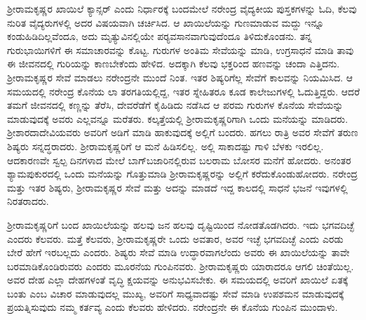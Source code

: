 ಶ‍್ರೀರಾಮಕೃಷ್ಣರ ಖಾಯಿಲೆ ಕ್ಯಾನ್ಸರ್ ಎಂದು ನಿರ್ಧಾರಕ್ಕೆ ಬಂದಮೇಲೆ ನರೇಂದ್ರ ವೈದ್ಯಕೀಯ ಪುಸ್ತಕಗಳನ್ನು ಓದಿ, ಕೆಲವು ನುರಿತ ವೈದ್ಯರುಗಳಲ್ಲಿ ಅದರ ವಿಷಯವಾಗಿ ಚರ್ಚಿಸಿದ. ಆ ಖಾಯಿಲೆಯನ್ನು ಗುಣಮಾಡುವ ಮದ್ದು ಇನ್ನೂ ಕಂಡುಹಿಡಿದಿಲ್ಲವೆಂದೂ, ಅದು ಮೃತ್ಯುವಿನಲ್ಲಿಯೇ ಪರ‍್ಯವಸಾನವಾಗುವುದೆಂದೂ ತಿಳಿದುಕೊಂಡನು. ತನ್ನ ಗುರುಭಾಯಿಗಳಿಗೆ ಈ ಸಮಾಚಾರವನ್ನು ಕೊಟ್ಟ. ಗುರುಗಳ ಅಂತಿಮ ಸೇವೆಯನ್ನು ಮಾಡಿ, ಉಗ್ರಸಾಧನೆ ಮಾಡಿ ತಾವು ಈ ಜೀವನದಲ್ಲಿ ಗುರಿಯನ್ನು ಕಾಣಬೇಕೆಂದು ಹೇಳಿದ. ಅದಕ್ಕಾಗಿ ಕೆಲವು ಭಕ್ತರಿಂದ ಹಣವನ್ನು ಚಂದಾ ಎತ್ತಿದನು. ಶ‍್ರೀರಾಮಕೃಷ್ಣರ ಸೇವೆ ಮಾಡಲು ನರೇಂದ್ರನೇ ಮುಂದೆ ನಿಂತ. ಇತರ ಶಿಷ್ಯರಿಗೆಲ್ಲ ಸೇವೆಗೆ ಕಾಲವನ್ನು ನಿಯಮಿಸಿದ. ಆ ಸಮಯದಲ್ಲಿ ನರೇಂದ್ರ ಕೊನೆಯ ಲಾ ತರಗತಿಯಲ್ಲಿದ್ದ, ಇತರ ಸ್ನೇಹಿತರೂ ಕೂಡ ಕಾಲೇಜುಗಳಲ್ಲಿ ಓದುತ್ತಿದ್ದರು. ಆದರೆ ತಮಗೆ ಜೀವನದಲ್ಲಿ ಕಣ್ಣನ್ನು ತೆರೆಸಿ, ದೇವರೆಡೆಗೆ ಕೈಹಿಡಿದು ನಡೆಸಿದ ಆ ಪರಮ ಗುರುಗಳ ಕೊನೆಯ ಸೇವೆಯನ್ನು ಮಾಡುವುದಕ್ಕೆ ಅವರು ಎಲ್ಲವನ್ನೂ ಮರೆತರು. ಕಲ್ಕತ್ತೆಯಲ್ಲಿ ಶ‍್ರೀರಾಮಕೃಷ್ಣರಿಗಾಗಿ ಒಂದು ಮನೆಯನ್ನು ಮಾಡಿದರು. ಶ‍್ರೀಶಾರದಾದೇವಿಯವರು ಅವರಿಗೆ ಅಡಿಗೆ ಮಾಡಿ ಹಾಕುವುದಕ್ಕೆ ಅಲ್ಲಿಗೆ ಬಂದರು. ಹಗಲು ರಾತ್ರಿ ಅವರ ಸೇವೆಗೆ ತರುಣ ಶಿಷ್ಯರು ಸನ್ನದ್ಧರಾದರು. ಶ‍್ರೀರಾಮಕೃಷ್ಣರಿಗೆ ಆ ಮನೆ ಹಿಡಿಸಲಿಲ್ಲ. ಅಲ್ಲಿ ಸಾಕಾದಷ್ಟು ಗಾಳಿ ಬೆಳಕು ಇರಲಿಲ್ಲ. ಆದಕಾರಣವೇ ಸ್ವಲ್ಪ ದಿನಗಳಾದ ಮೇಲೆ ಬಾಗ್‍ಬಜಾರಿನಲ್ಲಿರುವ ಬಲರಾಮ ಬೋಸರ ಮನೆಗೆ ಹೋದರು. ಅನಂತರ ಶ್ಯಾಮಪುಕುರದಲ್ಲಿ ಒಂದು ಮನೆಯನ್ನು ಗೊತ್ತುಮಾಡಿ ಶ‍್ರೀರಾಮಕೃಷ್ಣರನ್ನು ಅಲ್ಲಿಗೆ ಕರೆದುಕೊಂಡುಹೋದರು. ನರೇಂದ್ರ ಮತ್ತು ಇತರ ಶಿಷ್ಯರು, ಶ‍್ರೀರಾಮಕೃಷ್ಣರ ಸೇವೆ ಮತ್ತು ಅದನ್ನು ಮಾಡದೆ ಇದ್ದ ಕಾಲದಲ್ಲಿ ಸಾಧನೆ ಭಜನೆ ಇವುಗಳಲ್ಲಿ ನಿರತರಾದರು.

ಶ‍್ರೀರಾಮಕೃಷ್ಣರಿಗೆ ಬಂದ ಖಾಯಿಲೆಯನ್ನು ಹಲವು ಜನ ಹಲವು ದೃಷ್ಟಿಯಿಂದ ನೋಡತೊಡಗಿದರು. ಇದು ಭಗವದಿಚ್ಛೆ ಎಂದರು ಕೆಲವರು. ಮತ್ತೆ ಕೆಲವರು, ಶ‍್ರೀರಾಮಕೃಷ್ಣರೇ ಒಂದು ಅವತಾರ, ಅವರ ಇಚ್ಛೆ ಭಗವದಿಚ್ಛೆ ಎಂದು ಎರಡು ಬೇರೆ ಹೇಗೆ ಇರಬಲ್ಲದು ಎಂದರು. ಶಿಷ್ಯರು ಸೇವೆ ಮಾಡಿ ಉದ್ಧಾರವಾಗಲೆಂದು ಅವರು ಈ ಖಾಯಿಲೆಯನ್ನು ತಾವೇ ಬರಮಾಡಿಕೊಂಡಿರುವರು ಎಂದರು ಮೂರನೆಯ ಗುಂಪಿನವರು. ಶ‍್ರೀರಾಮಕೃಷ್ಣರು ಯಾರಾದರೂ ಆಗಲಿ ಚಿಂತೆಯಿಲ್ಲ. ಅವರ ದೇಹ ಎಲ್ಲಾ ದೇಹಗಳಂತೆ ವೃದ್ಧಿ ಕ್ಷಯವನ್ನು ಅನುಭವಿಸಬೇಕು. ಈ ಸಮಯದಲ್ಲಿ ಅವರಿಗೆ ಖಾಯಿಲೆ ಏತಕ್ಕೆ ಬಂತು ಎಂಬ ವಿಚಾರ ಮಾಡುವುದಲ್ಲ ಮುಖ್ಯ, ಅವರಿಗೆ ಸಾಧ್ಯವಾದಷ್ಟು ಸೇವೆ ಮಾಡಿ ಉಪಶಮನ ಮಾಡುವುದಕ್ಕೆ ಪ್ರಯತ್ನಿಸುವುದು ನಮ್ಮ ಕರ್ತವ್ಯ ಎಂದು ಕೆಲವರು ಹೇಳಿದರು. ನರೇಂದ್ರನೇ ಈ ಕೊನೆಯ ಗುಂಪಿನ ಮುಂದಾಳು.

